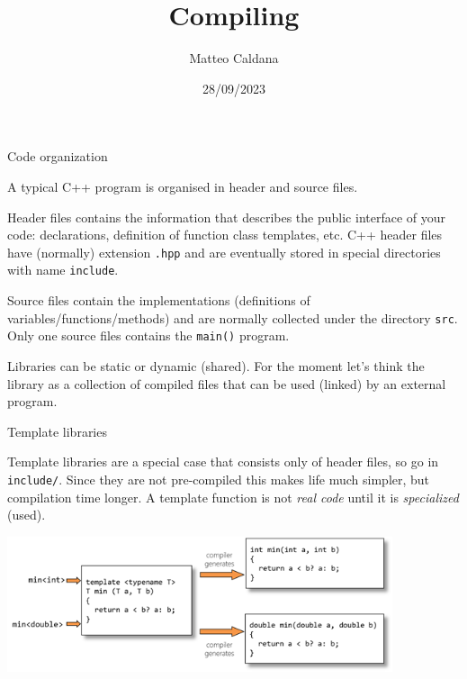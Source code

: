 \documentclass[12pt,aspectratio=169]{beamer}
\begin{document}
  \title{Compiling}
  \author{Matteo Caldana}
  \date{28/09/2023}
    
  \begin{frame}
    \maketitle
  \end{frame}

\begin{frame}{Code organization}

  A typical C++ program is organised in {\color{blue} header} and {\color{blue} source} files.  
  \smallskip

  \alert{Header files} contains the information that
  describes the public interface of your code: declarations,
  definition of function class templates, etc. 
  C++ header files have (normally) extension \texttt{.hpp} and are eventually stored in special directories with name \texttt{include}.
  \smallskip

  \alert{Source files} contain the implementations (definitions of variables/functions/methods) and are normally collected
  under the directory \texttt{src}. Only one source files contains the \texttt{main()} program.
  \smallskip

  {\color{blue} Libraries} can be static or dynamic (shared). For the moment let's think the library as a
  collection of compiled files that can be used (linked) by an external
  program. 
  \smallskip

  
\end{frame}

\begin{frame}{Template libraries}

  {\color{blue} Template libraries} are a special case that consists only of header files, so go in \texttt{include/}. Since they are not pre-compiled this makes life much simpler, but compilation time longer. A template function is not \textit{real code} until it is \textit{specialized} (used).

  \centerline{\includegraphics[width=0.85\textwidth]{template}}
   
\end{frame}
\end{document}
